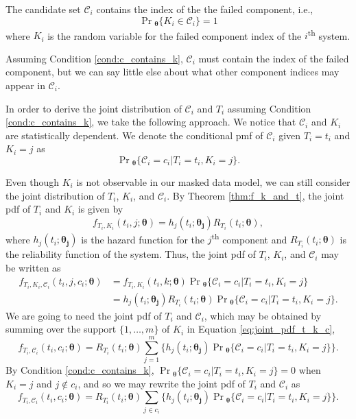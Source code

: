 \documentclass[
]{article}
\begin{document}
\begin{condition}
\label{cond:c_contains_k}
The candidate set $\mathcal{C}_i$ contains the index of the the failed component, i.e.,
$$
\Pr{}_{\!\boldsymbol{\theta}}\{K_i \in \mathcal{C}_i\} = 1
$$
where $K_i$ is the random variable for the failed component index of the
$i$\textsuperscript{th} system.
\end{condition}

Assuming Condition \ref{cond:c_contains_k}, \(\mathcal{C}_i\) must
contain the index of the failed component, but we can say little else
about what other component indices may appear in \(\mathcal{C}_i\).

In order to derive the joint distribution of \(\mathcal{C}_i\) and
\(T_i\) assuming Condition \ref{cond:c_contains_k}, we take the
following approach. We notice that \(\mathcal{C}_i\) and \(K_i\) are
statistically dependent. We denote the conditional pmf of
\(\mathcal{C}_i\) given \(T_i = t_i\) and \(K_i = j\) as \[
\Pr{}_{\!\boldsymbol{\theta}}\{\mathcal{C}_i = c_i | T_i = t_i, K_i = j\}.
\]

Even though \(K_i\) is not observable in our masked data model, we can
still consider the joint distribution of \(T_i\), \(K_i\), and
\(\mathcal{C}_i\). By Theorem \ref{thm:f_k_and_t}, the joint pdf of
\(T_i\) and \(K_i\) is given by \[
f_{T_i,K_i}(t_i,j;\boldsymbol{\theta}) = h_j(t_i;\boldsymbol{\theta_j}) R_{T_i}(t_i;\boldsymbol{\theta}),
\] where \(h_j(t_i;\boldsymbol{\theta_j})\) is the hazard function for
the \(j\)\textsuperscript{th} component and
\(R_{T_i}(t_i;\boldsymbol{\theta})\) is the reliability function of the
system. Thus, the joint pdf of \(T_i\), \(K_i\), and \(\mathcal{C}_i\)
may be written as \begin{equation}
\label{eq:joint_pdf_t_k_c}
\begin{split}
f_{T_i,K_i,\mathcal{C}_i}(t_i,j,c_i;\boldsymbol{\theta})
    &= f_{T_i,K_i}(t_i,k;\boldsymbol{\theta}) \Pr{}_{\!\boldsymbol{\theta}}\{\mathcal{C}_i=c_i|T_i=t_i,K_i=j\}\\
    &= h_j(t_i;\boldsymbol{\theta_j}) R_{T_i}(t_i;\boldsymbol{\theta})
    \Pr{}_{\!\boldsymbol{\theta}}\{\mathcal{C}_i=c_i|T_i=t_i,K_i=j\}.
\end{split}
\end{equation} We are going to need the joint pdf of \(T_i\) and
\(\mathcal{C}_i\), which may be obtained by summing over the support
\(\{1,\ldots,m\}\) of \(K_i\) in Equation \eqref{eq:joint_pdf_t_k_c}, \[
f_{T_i,\mathcal{C}_i}(t_i,c_i;\boldsymbol{\theta}) = R_{T_i}(t_i;\boldsymbol{\theta})
    \sum_{j=1}^m \biggl\{
        h_j(t_i;\boldsymbol{\theta_j}) \Pr{}_{\!\boldsymbol{\theta}}\{\mathcal{C}_i=c_i|T_i=t_i,K_i=j\}
    \biggr\}.
\] By Condition \ref{cond:c_contains_k},
\(\Pr{}_{\!\boldsymbol{\theta}}\{\mathcal{C}_i=c_i|T_i=t_i,K_i=j\} = 0\)
when \(K_i = j\) and \(j \notin c_i\), and so we may rewrite the joint
pdf of \(T_i\) and \(\mathcal{C}_i\) as \begin{equation}
\label{eq:part1}
f_{T_i,\mathcal{C}_i}(t_i,c_i;\boldsymbol{\theta}) = R_{T_i}(t_i;\boldsymbol{\theta})
    \sum_{j \in c_i} \biggl\{
        h_j(t_i;\boldsymbol{\theta_j}) \Pr{}_{\!\boldsymbol{\theta}}\{\mathcal{C}_i=c_i|T_i=t_i,K_i=j\}
    \biggr\}.
\end{equation}
\end{document}
